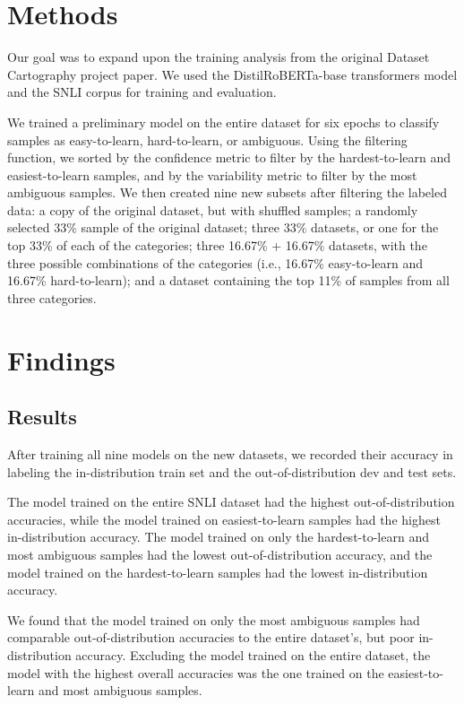 \documentclass[11pt, a4paper, twocolumn]{article}
\begin{document}
	\section{Methods}
	
	Our goal was to expand upon the training analysis from the original Dataset Cartography project paper. We used the DistilRoBERTa-base transformers model and the SNLI corpus for training and evaluation.
	
	We trained a preliminary model on the entire dataset for six epochs to classify samples as easy-to-learn, hard-to-learn, or ambiguous. Using the filtering function, we sorted by the confidence metric to filter by the hardest-to-learn and easiest-to-learn samples, and by the variability metric to filter by the most ambiguous samples. We then created nine new subsets after filtering the labeled data: a copy of the original dataset, but with shuffled samples; a randomly selected 33\% sample of the original dataset; three 33\% datasets, or one for the top 33\% of each of the categories; three 16.67\% + 16.67\% datasets, with the three possible combinations of the categories (i.e., 16.67\% easy-to-learn and 16.67\% hard-to-learn); and a dataset containing the top 11\% of samples from all three categories.
	
	\section{Findings}
	
	\subsection{Results}
	
	After training all nine models on the new datasets, we recorded their accuracy in labeling the in-distribution train set and the out-of-distribution dev and test sets.

	The model trained on the entire SNLI dataset had the highest out-of-distribution accuracies, while the model trained on easiest-to-learn samples had the highest in-distribution accuracy. The model trained on only the hardest-to-learn and most ambiguous samples had the lowest out-of-distribution accuracy, and the model trained on the hardest-to-learn samples had the lowest in-distribution accuracy. 

	We found that the model trained on only the most ambiguous samples had comparable out-of-distribution accuracies to the entire dataset's, but poor in-distribution accuracy. Excluding the model trained on the entire dataset, the model with the highest overall accuracies was the one trained on the easiest-to-learn and most ambiguous samples. 
	
\end{document}
